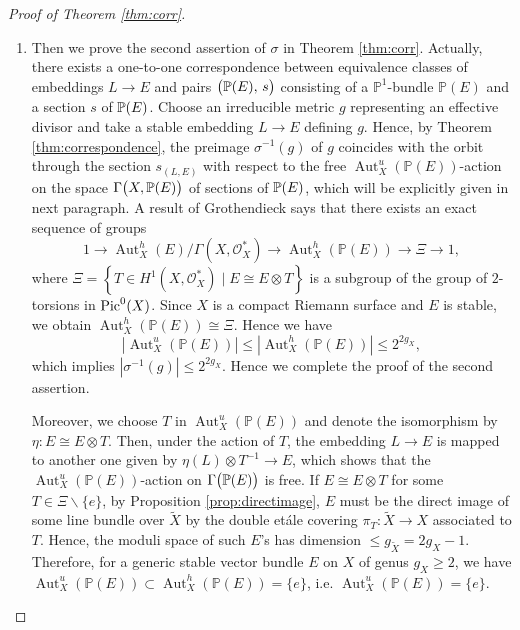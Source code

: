 \documentclass[12pt]{article}
\begin{document}
\begin{proof}[Proof of Theorem \ref{thm:corr}]
\begin{enumerate}
\item Then we prove the second assertion of $\sigma$ in Theorem \ref{thm:corr}. Actually, there exists a one-to-one correspondence between equivalence classes of embeddings $L \to E$ and pairs $\big({\Bbb P}(E),\,s\big)$ consisting of a $\mathbb{P}^{1}$-bundle $\mathbb{P}(E)$ and a section $s$ of ${\Bbb P}(E)$.
 Choose an irreducible metric $g$ representing an effective divisor and take a stable embedding $L\to E$ defining $g$.
 Hence, by Theorem \ref{thm:correspondence}, the preimage $\sigma^{-1}(g)$ of $g$ coincides with the orbit through the section $s_{(L,E)}$  with respect to the  free $\operatorname{Aut}_{X}^{u}(\mathbb{P}(E))$-action on the space $\Gamma\big(X, {\Bbb P}(E)\bigr)$ of sections of ${\Bbb P}(E)$, which will be explicitly given in next paragraph.
 A result of Grothendieck \cite[Section 5]{Gro1958} says that there exists an exact sequence of groups
\[ 1 \to \operatorname{Aut}_{X}^{h}(E)/ \Gamma(X, \mathcal{O}_{X}^{*}) \to \operatorname{Aut}_{X}^{h} (\mathbb{P}(E)) \to \varXi \to 1, \]
where $\varXi = \left\{ T \in H^{1}(X, \mathcal{O}_{X}^{*}) \mid E \cong E \otimes T \right\}$  is a subgroup of the group of $2$-torsions in ${\rm Pic}^{0}(X)$. Since $X$ is a compact Riemann surface and $E$ is stable, we obtain
$\operatorname{Aut}_{X}^{h} (\mathbb{P}(E)) \cong \varXi.$
Hence we have
\[ \left| \operatorname{Aut}_{X}^{u} (\mathbb{P}(E)) \right| \leq \left| \operatorname{Aut}_{X}^{h} (\mathbb{P}(E)) \right| \leq 2^{2g_{X}}, \]
which implies $|\sigma^{-1}(g)|\leq 2^{2g_X}$. Hence we complete the proof of the second assertion.

Moreover, we choose $T$ in $\operatorname{Aut}_{X}^{u} (\mathbb{P}(E))$ and denote the isomorphism by $\eta \colon E \cong E \otimes T$. Then, under the action of $T$, the embedding $L \to E$ is mapped to another one given by $\eta(L) \otimes T^{-1} \to E$, which shows that the $\operatorname{Aut}_{X}^{u} (\mathbb{P}(E))$-action on $\Gamma\big({\Bbb P}(E)\big)$ is free.
If $E \cong E \otimes T$ for some $T \in \varXi\backslash\{e\}$, by Proposition \ref{prop:directimage},
$E$ must be the direct image of some line bundle over $\widetilde X$ by the double et\' ale covering $\pi_T:\widetilde X\to X$ associated to $T$. Hence, the moduli space of such $E$'s has dimension $\leq g_{\widetilde X}=2g_{X} - 1$. Therefore, for a generic stable vector bundle $E$ on $X$ of genus $g_{X} \geq 2$, we have $\operatorname{Aut}_{X}^{u} (\mathbb{P}(E)) \subset \operatorname{Aut}_{X}^{h} (\mathbb{P}(E)) =\{e\}$, i.e. $\operatorname{Aut}_{X}^{u} (\mathbb{P}(E)) =\{e\}$.


\end{enumerate}
\end{proof}
\end{document}
